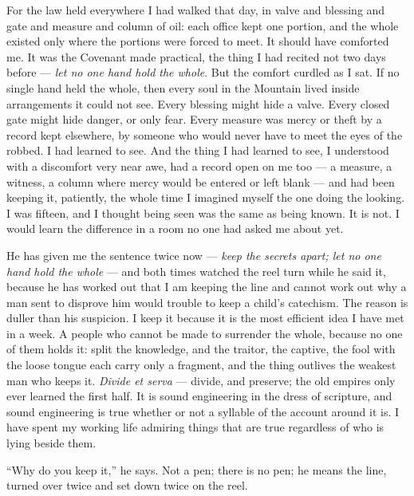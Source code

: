 For the law held everywhere I had walked that day, in valve and blessing and gate and measure and column of oil: each office kept one portion, and the whole existed only where the portions were forced to meet. It should have comforted me. It was the Covenant made practical, the thing I had recited not two days before --- \textit{let no one hand hold the whole}. But the comfort curdled as I sat. If no single hand held the whole, then every soul in the Mountain lived inside arrangements it could not see. Every blessing might hide a valve. Every closed gate might hide danger, or only fear. Every measure was mercy or theft by a record kept elsewhere, by someone who would never have to meet the eyes of the robbed. I had learned to see. And the thing I had learned to see, I understood with a discomfort very near awe, had a record open on me too --- a measure, a witness, a column where mercy would be entered or left blank --- and had been keeping it, patiently, the whole time I imagined myself the one doing the looking. I was fifteen, and I thought being seen was the same as being known. It is not. I would learn the difference in a room no one had asked me about yet.\par

\ornament

\noindent He has given me the sentence twice now --- \textit{keep the secrets apart; let no one hand hold the whole} --- and both times watched the reel turn while he said it, because he has worked out that I am keeping the line and cannot work out why a man sent to disprove him would trouble to keep a child's catechism. The reason is duller than his suspicion. I keep it because it is the most efficient idea I have met in a week. A people who cannot be made to surrender the whole, because no one of them holds it: split the knowledge, and the traitor, the captive, the fool with the loose tongue each carry only a fragment, and the thing outlives the weakest man who keeps it. \textit{Divide et serva} --- divide, and preserve; the old empires only ever learned the first half. It is sound engineering in the dress of scripture, and sound engineering is true whether or not a syllable of the account around it is. I have spent my working life admiring things that are true regardless of who is lying beside them.\par

``Why do you keep it,'' he says. Not a pen; there is no pen; he means the line, turned over twice and set down twice on the reel.\par

